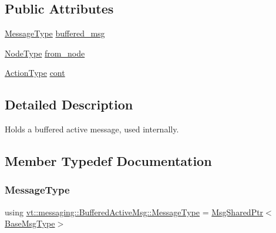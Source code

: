 \subsection*{Public Attributes}
\begin{DoxyCompactItemize}
\item 
\hyperlink{structvt_1_1messaging_1_1_buffered_active_msg_a36c6d58d477907e916a251fb358f9154}{Message\+Type} \hyperlink{structvt_1_1messaging_1_1_buffered_active_msg_a88906175db478caa759a279ba6c43bea}{buffered\+\_\+msg}
\item 
\hyperlink{namespacevt_a866da9d0efc19c0a1ce79e9e492f47e2}{Node\+Type} \hyperlink{structvt_1_1messaging_1_1_buffered_active_msg_a54ea3b62b0e7f9ec65d866c7afc82770}{from\+\_\+node}
\item 
\hyperlink{namespacevt_ae0a5a7b18cc99d7b732cb4d44f46b0f3}{Action\+Type} \hyperlink{structvt_1_1messaging_1_1_buffered_active_msg_aced58d5a05c15a2e6eeca7b72bd45e47}{cont}
\end{DoxyCompactItemize}


\subsection{Detailed Description}
Holds a buffered active message, used internally. 

\subsection{Member Typedef Documentation}
\mbox{\label{structvt_1_1messaging_1_1_buffered_active_msg_a36c6d58d477907e916a251fb358f9154}} 
\subsubsection{\texorpdfstring{Message\+Type}{MessageType}}
{\footnotesize\ttfamily using \hyperlink{structvt_1_1messaging_1_1_buffered_active_msg_a36c6d58d477907e916a251fb358f9154}{vt\+::messaging\+::\+Buffered\+Active\+Msg\+::\+Message\+Type} =  \hyperlink{structvt_1_1messaging_1_1_msg_shared_ptr}{Msg\+Shared\+Ptr}$<$\hyperlink{namespacevt_a44d0d4e144748f2b19a1cfd962f50338}{Base\+Msg\+Type}$>$}



